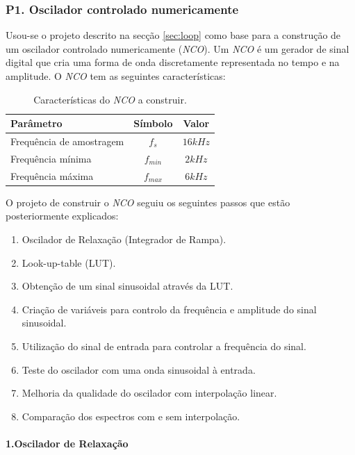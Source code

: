 \documentclass[11pt]{article}
\numberwithin{equation}{section}
\begin{document}
\subsubsection{P1. Oscilador controlado numericamente}
\label{NCO}
Usou-se o projeto descrito na secção \ref{sec:loop} como base para a construção de um oscilador controlado numericamente (\textit{NCO}). Um \textit{NCO} é um gerador de sinal digital que cria uma forma de onda discretamente representada no tempo e na amplitude. O \textit{NCO} tem as seguintes características:

\begin{table}[H]
	\centering
	\caption{Características do \textit{NCO} a construir.}
	\label{tab:NCO-car}
\begin{tabular}[c]{|l||c|c|}
	\hline \textbf{Parâmetro} & \textbf{Símbolo} & \textbf{Valor} \\ 
	\hline Frequência de amostragem & $ f_{s} $ & $ 16 kHz $ \\ 
	\hline Frequência mínima & $ f_{min} $ & $ 2 kHz $ \\ 
	\hline Frequência máxima & $ f_{max} $ & $ 6 kHz $ \\ 
	\hline
\end{tabular}
\end{table}

O projeto de construir o \textit{NCO} seguiu os seguintes passos que estão posteriormente explicados:

\begin{enumerate}
	\item Oscilador de Relaxação (Integrador de Rampa). 
	\item Look-up-table (LUT). 
	\item Obtenção de um sinal sinusoidal através da LUT.
	\item Criação de variáveis para controlo da frequência e amplitude do sinal sinusoidal.
	\item Utilização do sinal de entrada para controlar a frequência do sinal.
	\item Teste do oscilador com uma onda sinusoidal à entrada.
	\item Melhoria da qualidade do oscilador com interpolação linear.  
	\item Comparação dos espectros com e sem interpolação.
\end{enumerate}

\paragraph{1.Oscilador de Relaxação} \hspace{0pt}
\end{document}
